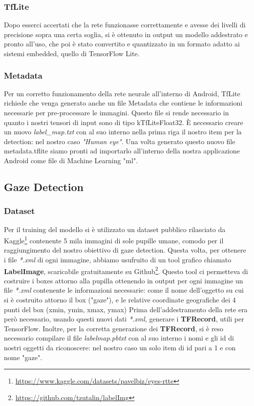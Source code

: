 \documentclass[11pt]{article}
\begin{document}
\subsubsection{TfLite}
Dopo esserci accertati che la rete funzionasse correttamente e avesse dei livelli di precisione sopra una certa soglia, si è ottenuto in output un modello addestrato
e pronto all’uso, che poi è stato convertito e quantizzato in un formato adatto ai sistemi embedded, quello di TensorFlow Lite.
\subsubsection{Metadata}
Per un corretto funzionamento della rete neurale all'interno di Android, TfLite richiede che venga generato anche un file Metadata che contiene le informazioni necessarie per pre-processare le immagini. Questo file si rende necessario in quanto i nostri tensori di input sono di tipo kTfLiteFloat32. È necessario creare un nuovo \textit{label\_map.txt} con al suo interno nella prima riga il nostro item per la detection: nel nostro caso \textit{"Human eye"}.
\newline
Una volta generato questo nuovo file metadata.tflite siamo pronti ad importarlo all'interno della nostra applicazione Android come file di Machine Learning "ml".

\newpage    
\subsection{Gaze Detection}

\subsubsection{Dataset}
Per il training del modello si è utilizzato un dataset pubblico rilasciato da Kaggle\footnote{\url{https://www.kaggle.com/datasets/pavelbiz/eyes-rtte}} contenente 5 mila immagini di sole pupille umane, comodo per il raggiungimento del nostro obiettivo di gaze detection.
\newline
Questa volta, per ottenere i file \textit{*.xml} di ogni immagine, abbiamo usufruito di un tool grafico chiamato \textbf{LabelImage}, scaricabile gratuitamente su Github\footnote{\url{https://github.com/tzutalin/labelImg}}. Questo tool ci permetteva di costruire i boxes attorno alla pupilla ottenendo in output per ogni immagine un file \textit{*.xml} contenente le informazioni necessarie: come il nome dell'oggetto su cui si è costruito attorno il box ("gaze"), e le relative coordinate geografiche dei 4 punti del box (xmin, ymin, xmax, ymax)
\newline \newline
Prima dell'addestramento della rete era però necessario, usando questi nuovi dati \textit{*.xml}, generare i \textbf{TFRecord}, utili per TensorFlow.
Inoltre, per la corretta generazione dei \textbf{TFRecord}, si è reso necessario compilare il file \textit{labelmap.pbtxt} con al suo interno i nomi e gli id di nostri oggetti da riconoscere: nel nostro caso un solo item di id pari a 1 e con nome "gaze".
\end{document}
